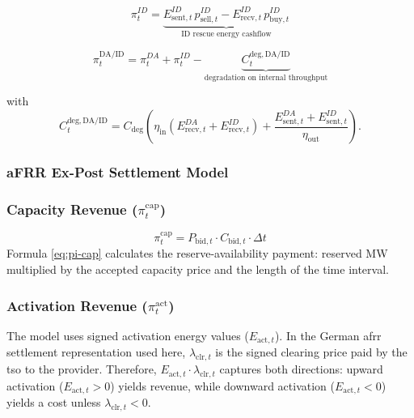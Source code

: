\begin{equation}\label{eq:pi-id}
    \pi^{ID}_t
    =
    \underbrace{E^{ID}_{\mathrm{sent},t}\,p^{ID}_{\mathrm{sell},t}
        -
        E^{ID}_{\mathrm{recv},t}\,p^{ID}_{\mathrm{buy},t}}_{\text{ID rescue energy cashflow}}
\end{equation}

\begin{equation}\label{eq:pi-daid-realized-separated}
    \pi^{\mathrm{DA/ID}}_t
    =
    \pi^{DA}_t+\pi^{ID}_t
    -
    \underbrace{C^{\mathrm{deg,DA/ID}}_t}_{\text{degradation on internal throughput}}
\end{equation}

with
\begin{equation}\label{eq:cdeg-daid}
    C^{\mathrm{deg,DA/ID}}_t
    =
    C_{\mathrm{deg}}
    \left(
    \eta_{\text{in}}\!\left(E^{DA}_{\mathrm{recv},t}+E^{ID}_{\mathrm{recv},t}\right)
    +
    \frac{E^{DA}_{\mathrm{sent},t}+E^{ID}_{\mathrm{sent},t}}{\eta_{\text{out}}}
    \right).
\end{equation}

\subsubsection{aFRR Ex-Post Settlement Model}


\subsubsection{Capacity Revenue ($\pi_{t}^{\text{cap}}$)}

\begin{equation}\label{eq:pi-cap}
    \pi_{t}^{\text{cap}} = P_{\text{bid}, t} \cdot C_{\text{bid}, t} \cdot \Delta t
\end{equation}
Formula \ref{eq:pi-cap} calculates the reserve-availability payment: reserved MW multiplied by the accepted capacity price and the length of the time interval.


\subsubsection{Activation Revenue ($\pi_{t}^{\text{act}}$)}

The model uses signed activation energy values ($E_{\text{act}, t}$). In the German \gls{afrr} settlement representation used here, $\lambda_{\text{clr}, t}$ is the signed clearing price paid by the \gls{tso} to the provider. Therefore, $E_{\text{act}, t}\cdot\lambda_{\text{clr}, t}$ captures both directions: upward activation ($E_{\text{act}, t}>0$) yields revenue, while downward activation ($E_{\text{act}, t}<0$) yields a cost unless $\lambda_{\text{clr}, t}<0$.

